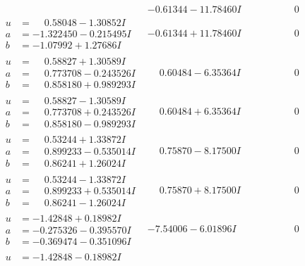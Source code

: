 \documentclass[1p]{elsarticle_modified}
\theoremstyle{definition}
\begin{document}
$$\begin{array}{c|c|c}
 & -0.61344 - 11.78460 I & \phantom{-0.000000 } 0 \\ \hline\begin{aligned}
u &= \phantom{-}0.58048 - 1.30852 I \\
a &= -1.322450 - 0.215495 I \\
b &= -1.07992 + 1.27686 I\end{aligned}
 & -0.61344 + 11.78460 I & \phantom{-0.000000 } 0 \\ \hline\begin{aligned}
u &= \phantom{-}0.58827 + 1.30589 I \\
a &= \phantom{-}0.773708 - 0.243526 I \\
b &= \phantom{-}0.858180 + 0.989293 I\end{aligned}
 & \phantom{-}0.60484 - 6.35364 I & \phantom{-0.000000 } 0 \\ \hline\begin{aligned}
u &= \phantom{-}0.58827 - 1.30589 I \\
a &= \phantom{-}0.773708 + 0.243526 I \\
b &= \phantom{-}0.858180 - 0.989293 I\end{aligned}
 & \phantom{-}0.60484 + 6.35364 I & \phantom{-0.000000 } 0 \\ \hline\begin{aligned}
u &= \phantom{-}0.53244 + 1.33872 I \\
a &= \phantom{-}0.899233 - 0.535014 I \\
b &= \phantom{-}0.86241 + 1.26024 I\end{aligned}
 & \phantom{-}0.75870 - 8.17500 I & \phantom{-0.000000 } 0 \\ \hline\begin{aligned}
u &= \phantom{-}0.53244 - 1.33872 I \\
a &= \phantom{-}0.899233 + 0.535014 I \\
b &= \phantom{-}0.86241 - 1.26024 I\end{aligned}
 & \phantom{-}0.75870 + 8.17500 I & \phantom{-0.000000 } 0 \\ \hline\begin{aligned}
u &= -1.42848 + 0.18982 I \\
a &= -0.275326 - 0.395570 I \\
b &= -0.369474 - 0.351096 I\end{aligned}
 & -7.54006 - 6.01896 I & \phantom{-0.000000 } 0 \\ \hline\begin{aligned}
u &= -1.42848 - 0.18982 I \\

\end{aligned}
\end{array}$$
\end{document}
